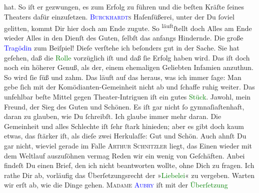                hat. So iſt er gezwungen, es zum Erfolg zu führen\strikeout{\textcolor{gray}{,}} und die beſten Kräſte ſeines Theaters dafür einzuſetzen. \textsc{\textcolor{blue}{Burckhardt}{}\ledrightnote{\textcolor{blue}{Max Eugen Burckhard}}s}{ }Haſenſüßerei, unter der Du ſoviel gelitten, kommt
               Dir hier doch am Ende zugute. So \substVorne{}\textsuperscript{läuft}\substDazwischen{}ſtellt\substHinten{} doch Alles am Ende wieder  Alles in den
               Dienſt {\pb}des Guten, ſelbſt das anfangs Hindernde. Die
               große \textcolor{blue}{Tragödin}{} zum Beiſpiel!
               Dieſe verſtehe ich beſonders gut in der Sache. Sie hat geſehen, daß die \textcolor{green}{Rolle}{} vorzüglich iſt und daß
               ſie Erfolg haben wird. Das iſt doch \strikeout{\textcolor{gray}{w}} noch ein höherer Genuß, als der,  einem ehemaligen Geliebten Infamien anzuthun. So
               wird ſie  ſüß und zahm. Das läuft auf das heraus, was ich immer ſage: Man gebe ſich mit
               der Komödianten-Gemeinheit {\pb}nicht ab und ſchaffe
               ruhig weiter. Das unfehlbar beſte Mittel gegen  Theater-Intriguen iſt ein gutes \textcolor{green}{Stück}{}. Jawohl, mein Freund, der Sieg des Guten und Schönen.
               Es iſt gar nicht ſo gymnaſiaſtenhaft, daran zu glauben, wie Du ſchreibſt. Ich glaube
               immer mehr daran. Die Gemeinheit und alles Schlechte iſt ſehr ſtark hinieden; aber es
               gibt doch kaum etwas, das ſtärker iſt, als dieſe zwei Herkulaſſe: {\pb}Gut und Schön. Auch ahnſt Du gar nicht, wieviel
               gerade im Falle \textsc{Arthur Schnitzler} liegt, das Einen wieder
               mit dem Weltlauf auszuſöhnen vermag{\dotssix}\pend
           \pstart
           Reden wir ein wenig von Geſchäften. Anbei findeſt Du einen Brief, den ich nicht
               beantworten wollte, ohne Dich zu fragen. Ich rathe Dir ab, vorläufig das
               Überſetzungsrecht der »\textcolor{green}{Liebelei}{}\ledrightnote{\textcolor{green}{Liebelei. Schauspiel in drei Akten}}« zu vergeben.
               Warten wir erſt ab, wie die Dinge gehen. \textsc{Madame \textcolor{blue}{Aubry}{}\ledrightnote{\textcolor{blue}{[MMe. Georges] Aubry}}} iſt mit der \textcolor{green}{Überſetzung}{}

